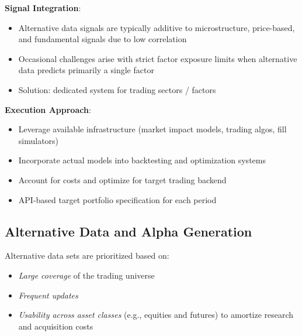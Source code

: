 \documentclass[11pt, letterpaper]{article}
\begin{document}
  \textbf{Signal Integration}:

  \begin{itemize}
    \item Alternative data signals are typically additive to microstructure,
      price-based, and fundamental signals due to low correlation

    \item Occasional challenges arise with strict factor exposure limits
      when alternative data predicts primarily a single factor

    \item Solution: dedicated system for trading sectors / factors
  \end{itemize}

  \textbf{Execution Approach}:

  \begin{itemize}
    \item Leverage available infrastructure (market impact models, trading
      algos, fill simulators)

    \item Incorporate actual models into backtesting and optimization systems

    \item Account for costs and optimize for target trading backend

    \item API-based target portfolio specification for each period
  \end{itemize}

  \subsection{Alternative Data and Alpha Generation}
  \label{alternative-data-and-alpha-generation}

  Alternative data sets are prioritized based on:

  \begin{itemize}
    \item \textit{Large coverage} of the trading universe

    \item \textit{Frequent updates}

    \item \textit{Usability across asset classes} (e.g., equities and
      futures) to amortize research and acquisition costs
  \end{itemize}
\end{document}
